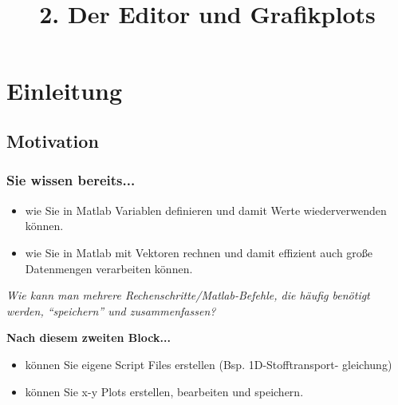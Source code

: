 

\title{\\{\scriptsize 2. Der Editor und Grafikplots}}


\setcounter{mchapter}{2}
\setcounter{mexercise}{0}


  

    \section{Einleitung}

    \subsection{Motivation}
    \begin{frame}
        \frametitle{Sie wissen bereits...}
        \begin{itemize}
            \item wie Sie in Matlab Variablen definieren und damit Werte wiederverwenden können.
            \item wie Sie in Matlab mit Vektoren rechnen und damit effizient auch große Datenmengen verarbeiten können.
        \end{itemize}

        \vspace{0.3cm}

        \textit{Wie kann man mehrere Rechenschritte/Matlab-Befehle, die häufig benötigt werden, ``speichern'' und zusammenfassen?} \\

        \vspace{0.3cm}

        \textbf{Nach diesem zweiten Block...} \\

        \vspace{0.3cm}

        \begin{itemize}
            \item können Sie eigene Script Files erstellen (Bsp. 1D-Stofftransport- gleichung)
            \item können Sie x-y Plots erstellen, bearbeiten und speichern.
        \end{itemize}
    \end{frame}


